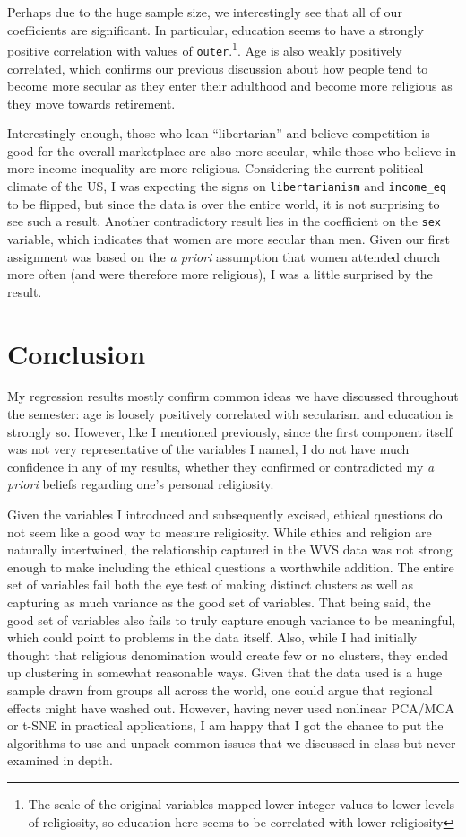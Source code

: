\documentclass{article}
\begin{document}
	Perhaps due to the huge sample size, we interestingly see that all of our coefficients are significant. In particular, education seems to have a strongly positive correlation with values of \texttt{outer}.\footnote{The scale of the original variables mapped lower integer values to lower levels of religiosity, so education here seems to be correlated with lower religiosity}. Age is also weakly positively correlated, which confirms our previous discussion about how people tend to become more secular as they enter their adulthood and become more religious as they move towards retirement.
	
	Interestingly enough, those who lean ``libertarian'' and believe competition is good for the overall marketplace are also more secular, while those who believe in more income inequality are more religious. Considering the current political climate of the US, I was expecting the signs on \texttt{libertarianism} and \texttt{income\_eq} to be flipped, but since the data is over the entire world, it is not surprising to see such a result. Another contradictory result lies in the coefficient on the \texttt{sex} variable, which indicates that women are more secular than men. Given our first assignment was based on the \textit{a priori} assumption that women attended church more often (and were therefore more religious), I was a little surprised by the result. 
	
	\section{Conclusion}
	My regression results mostly confirm common ideas we have discussed throughout the semester: age is loosely positively correlated with secularism and education is strongly so. However, like I mentioned previously, since the first component itself was not very representative of the variables I named, I do not have much confidence in any of my results, whether they confirmed or contradicted my \textit{a priori} beliefs regarding one's personal religiosity.
	
	Given the variables I introduced and subsequently excised, ethical questions do not seem like a good way to measure religiosity. While ethics and religion are naturally intertwined, the relationship captured in the WVS data was not strong enough to make including the ethical questions a worthwhile addition. The entire set of variables fail both the eye test of making distinct clusters as well as capturing as much variance as the good set of variables. That being said, the good set of variables also fails to truly capture enough variance to be meaningful, which could point to problems in the data itself. Also, while I had initially thought that religious denomination would create few or no clusters, they ended up clustering in somewhat reasonable ways. Given that the data used is a huge sample drawn from groups all across the world, one could argue that regional effects might have washed out. 	However, having never used nonlinear PCA/MCA or t-SNE in practical applications, I am happy that I got the chance to put the algorithms to use and unpack common issues that we discussed in class but never examined in depth.
		
	\newpage
	\nocite{*}
	
\end{document}
